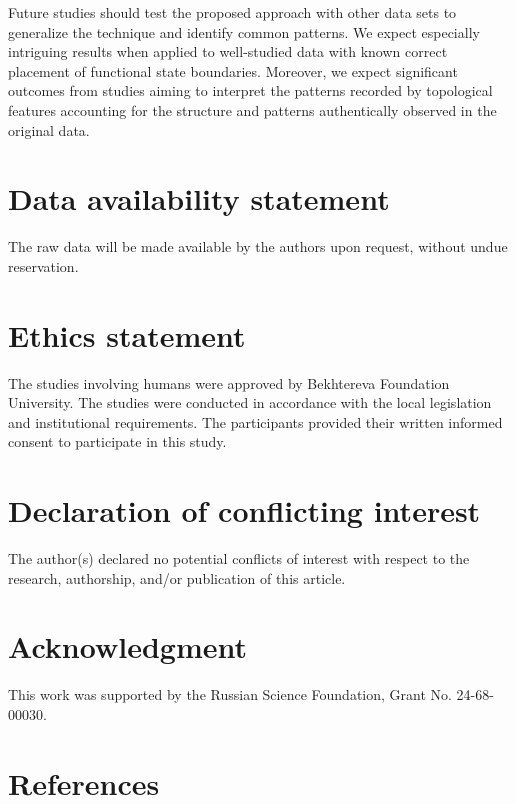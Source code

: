 \documentclass[10pt]{iopart}
\begin{document}
Future studies should test the proposed approach with other data sets to generalize the technique and identify common patterns. We expect especially intriguing results when applied to well-studied data with known correct placement of functional state boundaries. Moreover, we expect significant outcomes from studies aiming to interpret the patterns recorded by topological features accounting for the structure and patterns authentically observed in the original data.

\section*{Data availability statement}

The raw data will be made available by the authors upon request, without undue reservation.

\section*{Ethics statement}

The studies involving humans were approved by Bekhtereva Foundation University. The studies were conducted in accordance with the local legislation and institutional requirements. The participants provided their written informed consent to participate in this study.

\section*{Declaration of conflicting interest}

The author(s) declared no potential conflicts of interest with respect to the research, authorship, and/or publication of this article.

\section*{Acknowledgment}

This work was supported by the Russian Science Foundation, Grant No. 24-68-00030.

\section*{References}

{}

\end{document}
